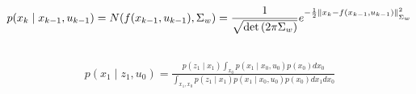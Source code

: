 \documentclass[a4paper]{scrreprt}
\begin{document}
\chapter{}
\section{}
\begin{gather}
	p(x_k\mid x_{k-1}, u_{k-1}) = N(f(x_{k-1}, u_{k-1}), \Sigma_w)
	= \frac{1}{\sqrt{\det\left(2\pi \Sigma_w\right)}} e^{-\frac{1}{2} 
	\nrmsq{_{\Sigma_w}}{x_k-f(x_{k-1},u_{k-1})}}
\end{gather}
\section{}
\begin{gather}
	p(x_1\mid z_1, u_0) = \frac{p(z_1\mid x_1)\int_{x_0}p(x_1\mid x_0, 
	u_0)p(x_0)dx_0}{\int_{x_1, x_0} p(z_1\mid x_1) p(x_1\mid x_0, u_0) 
	p(x_0)dx_1dx_0 } 
\end{gather}
\end{document}
